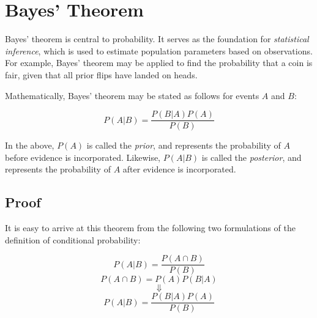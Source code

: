 \documentclass{article}
\date{}
\author{Kaan Aksoy | April 26, 2020}
\title{}
\begin{document}
\maketitle

\section{Bayes' Theorem}

Bayes' theorem is central to probability. It serves as the 
foundation for \textit{statistical inference}, which is used to estimate 
population parameters based on observations. For example, Bayes' 
theorem may be applied to find the probability that a coin is fair, 
given that all prior flips have landed on heads.

Mathematically, Bayes' theorem may be stated as follows for 
events $A$ and $B$:

$$
P(A|B) = \frac{P(B|A)P(A)}{P(B)}
$$

In the above, $P(A)$ is called the \textit{prior}, and represents  
the probability of $A$ before evidence is incorporated. Likewise, 
$P(A|B)$ is called the \textit{posterior}, and represents the 
probability of $A$ after evidence is incorporated. 

\subsection{Proof}
It is easy to arrive at this theorem from the following 
two formulations of the definition of conditional probability:

$$P(A|B) = \frac{P(A \cap B)}{P(B)}$$
$$P(A \cap B) = P(A)P(B|A)$$
$$\Downarrow$$
$$P(A|B) = \frac{P(B|A)P(A)}{P(B)}$$
\end{document}
